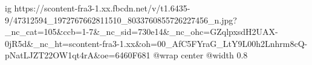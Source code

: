  
 
 
 
 

\ifcmt
  ig https://scontent-fra3-1.xx.fbcdn.net/v/t1.6435-9/47312594_1972767662811510_8033760855726227456_n.jpg?_nc_cat=105&ccb=1-7&_nc_sid=730e14&_nc_ohc=GZqlpxsdH2UAX-0jR5d&_nc_ht=scontent-fra3-1.xx&oh=00_AfC5FYraG_LtY9L00h2Lnhrm8cQ-pNatLJZT22OW1qt4rA&oe=6460F681
  @wrap center
  @width 0.8
\fi
